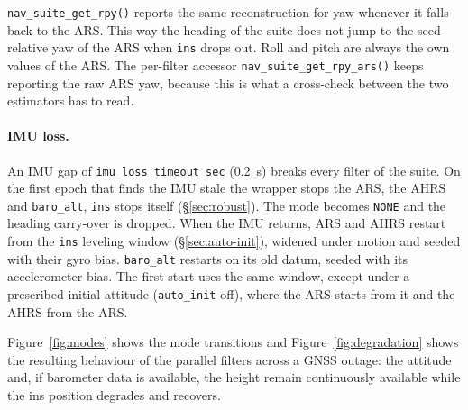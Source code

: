 \documentclass[11pt,a4paper]{article}
\newcommand{\code}[1]{\texttt{#1}}
\begin{document}
\code{nav\_\allowbreak{}suite\_\allowbreak{}get\_\allowbreak{}rpy()} reports
the same reconstruction for yaw whenever it falls back to the ARS. This way the
heading of the suite does not jump to the seed-relative yaw of the ARS when
\code{ins} drops out. Roll and pitch are always the own values of the ARS. The
per-filter accessor
\code{nav\_\allowbreak{}suite\_\allowbreak{}get\_\allowbreak{}rpy\_\allowbreak{}ars()}
keeps reporting the raw ARS yaw, because this is what a cross-check between the
two estimators has to read.

\paragraph{IMU loss.}
\label{sec:suite_imu_loss}
An IMU gap of \code{imu\_\allowbreak{}loss\_\allowbreak{}timeout\_\allowbreak{}sec}
(\SI{0.2}{\second}) breaks every filter of the suite. On the first epoch that
finds the IMU stale the wrapper stops the ARS, the AHRS and
\code{baro\_\allowbreak{}alt}, \code{ins} stops itself (\S\ref{sec:robust}).
The mode becomes \code{NONE} and the heading carry-over is dropped. When the
IMU returns, ARS and AHRS restart from the \code{ins} leveling window
(\S\ref{sec:auto-init}), widened under motion and seeded with their gyro bias.
\code{baro\_\allowbreak{}alt} restarts on its old datum, seeded with its
accelerometer bias. The first start uses the same window, except under a
prescribed initial attitude (\code{auto\_\allowbreak{}init} off), where the
ARS starts from it and the AHRS from the ARS.

Figure~\ref{fig:modes} shows the mode transitions and
Figure~\ref{fig:degradation} shows the resulting behaviour of the parallel
filters across a GNSS outage: the attitude and, if barometer data is available,
the height remain continuously available while the ins position degrades and
recovers.
\end{document}
